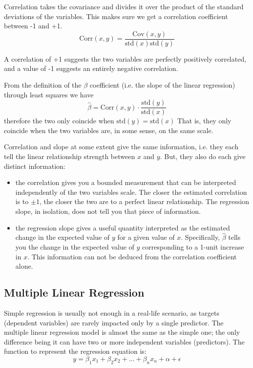 Correlation takes the covariance and divides it over the product of the standard deviations of the variables. This makes sure we get a correlation coefficient between -1 and +1.
\begin{equation}
\text{Corr}(x, y) = \frac{\text{Cov}(x, y)}{\text{std}(x)\text{std}(y)}
\end{equation}

A correlation of +1 suggests the two variables are perfectly positively correlated, and a value of -1 suggests an entirely negative correlation.

From the definition of the $\beta$ coefficient (i.e. the slope of the linear regression) through least squares we have
\begin{equation}
\hat{\beta} = \text{Corr}(x, y)\cdot \frac{\text{std}(y)}{\text{std}(x)}
\end{equation}
therefore the two only coincide when $\text{std}(y) = \text{std}(x)$ That is, they only coincide when the two variables are, in some sense, on the same scale. 

Correlation and slope at some extent give the same information, i.e. they each tell the linear relationship strength between $x$ and $y$. But, they also do each give distinct information:
\begin{itemize}
\item the correlation gives you a bounded measurement that can be interpreted independently of the two variables scale. The closer the estimated correlation is to $\pm1$, the closer the two are to a perfect linear relationship. The regression slope, in isolation, does not tell you that piece of information.
\item the regression slope gives a useful quantity interpreted as the estimated change in the expected value of $y$ for a given value of $x$. Specifically, $\hat{\beta}$ tells you the change in the expected value of $y$ corresponding to a 1-unit increase in $x$. This information can not be deduced from the correlation coefficient alone.
\end{itemize}

\subsection{Multiple Linear Regression}
Simple regression is usually not enough in a real-life scenario, as targets (dependent variables) are rarely impacted only by a single predictor.
The multiple linear regression model is almost the same as the simple one; the only difference being it can have two or more independent variables (predictors).
The function to represent the regression equation is:
\begin{equation}
y = \beta_1 x_1 + \beta_2 x_2 + \ldots + \beta_n x_n + \alpha + \epsilon
\label{eq:multiple_regression}
\end{equation}

